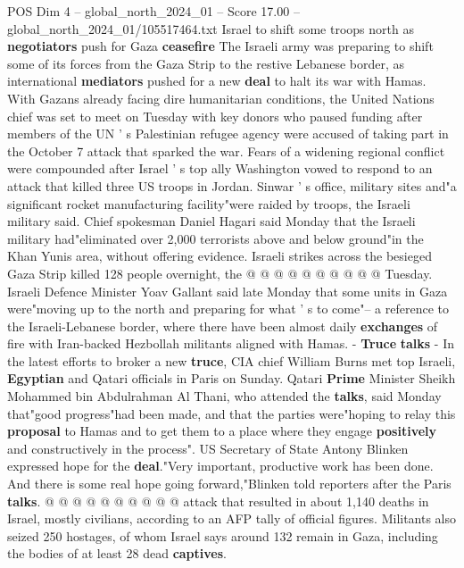 \begin{textsample}{POS Dim 4 – global\_north\_2024\_01 – Score 17.00 – global\_north\_2024\_01/105517464.txt}  \label{ex:f4_pos_348}
Israel to shift some troops north as \textbf{negotiators} push for Gaza \textbf{ceasefire} The Israeli army was preparing to shift some of its forces from the Gaza Strip to the restive Lebanese border, as international \textbf{mediators} pushed for a new \textbf{deal} to halt its war with Hamas.
With Gazans already facing dire humanitarian conditions, the United Nations chief was set to meet on Tuesday with key donors who paused funding after members of the UN ' s Palestinian refugee agency were accused of taking part in the October 7 attack that sparked the war.
Fears of a widening regional conflict were compounded after Israel ' s top ally Washington vowed to respond to an attack that killed three US troops in Jordan.
Sinwar ' s office, military sites and"a significant rocket manufacturing facility"were raided by troops, the Israeli military said.
Chief spokesman Daniel Hagari said Monday that the Israeli military had"eliminated over 2,000 terrorists above and below ground"in the Khan Yunis area, without offering evidence.
Israeli strikes across the besieged Gaza Strip killed 128 people overnight, the @ @ @ @ @ @ @ @ @ @ Tuesday.
Israeli Defence Minister Yoav Gallant said late Monday that some units in Gaza were"moving up to the north and preparing for what ' s to come"-- a reference to the Israeli-Lebanese border, where there have been almost daily \textbf{exchanges} of fire with Iran-backed Hezbollah militants aligned with Hamas. - \textbf{Truce} \textbf{talks} - In the latest efforts to broker a new \textbf{truce}, CIA chief William Burns met top Israeli, \textbf{Egyptian} and Qatari officials in Paris on Sunday.
Qatari \textbf{Prime} Minister Sheikh Mohammed bin Abdulrahman Al Thani, who attended the \textbf{talks}, said Monday that"good progress"had been made, and that the parties were"hoping to relay this \textbf{proposal} to Hamas and to get them to a place where they engage \textbf{positively} and constructively in the process".
US Secretary of State Antony Blinken expressed hope for the \textbf{deal}."Very important, productive work has been done.
And there is some real hope going forward,"Blinken told reporters after the Paris \textbf{talks}. @ @ @ @ @ @ @ @ @ @ attack that resulted in about 1,140 deaths in Israel, mostly civilians, according to an AFP tally of official figures.
Militants also seized 250 hostages, of whom Israel says around 132 remain in Gaza, including the bodies of at least 28 dead \textbf{captives}.

\end{textsample}
